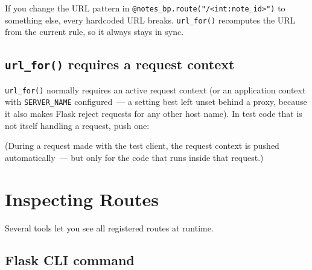 \noindent{}If you change the URL pattern in \texttt{@notes\_}\allowbreak{}\texttt{bp.}\allowbreak{}\texttt{route("/}\allowbreak{}\texttt{\textless{}int:}\allowbreak{}\texttt{note\_}\allowbreak{}\texttt{id\textgreater{}")} to something else, every hardcoded URL breaks. \texttt{url\_for()} recomputes the URL from the current rule, so it always stays in sync.

\subsection*{\texorpdfstring{\texttt{url\_for()} requires a request context}{url\_for() requires a request context}}\label{32-routing:url-for-requires-a-request-context}

\texttt{url\_for()} normally requires an active request context (or an application context with \texttt{SERVER\_NAME} configured~--- a setting best left unset behind a proxy, because it also makes Flask reject requests for any other host name). In test code that is not itself handling a request, push one:

\begin{codebox}[short]

\begin{Shaded}
\begin{Highlighting}[]
\OperatorTok{=}\OperatorTok{=}\NormalTok{)}
\end{Highlighting}
\end{Shaded}

\end{codebox}

\noindent{}(During a request made with the test client, the request context is pushed automatically~--- but only for the code that runs inside that request.)

\setcounter{section}{7}
\section{Inspecting Routes}\label{32-routing:328-inspecting-routes}

Several tools let you see all registered routes at runtime.

\subsection*{Flask CLI command}\label{32-routing:flask-cli-command}

